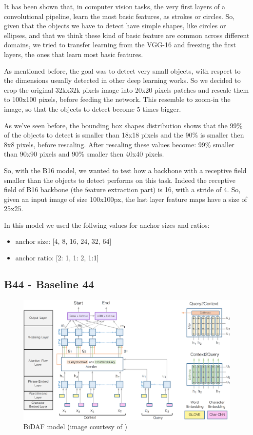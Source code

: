 \documentclass[a4paper,10pt]{report}
\begin{document}
It has been shown that, in computer vision tasks, the very first layers of a convolutional pipeline, learn the most basic features, as strokes or circles.
So, given that the objects we have to detect have simple shapes, like circles or ellipses, and that we think these kind of basic feature are common across different domains, 
we tried to transfer learning from the VGG-16 and freezing the first layers, the ones that learn most basic features.

As mentioned before, the goal was to detect very small objects, with respect to the dimensions usually detected in other deep learning works.
So we decided to crop the original 32kx32k pixels image into 20x20 pixels patches and rescale them to 100x100 pixels, before feeding the network.
This resemble to zoom-in the image, so that the objects to detect become 5 times bigger.

As we've seen before, the bounding box shapes distribution shows that the 99\% of the objects to detect is smaller than 18x18 pixels and the 90\% is smaller then 8x8 pixels, before rescaling.
After rescaling these values become: 99\% smaller than 90x90 pixels and 90\% smaller then 40x40 pixels.

So, with the B16 model, we wanted to test how a backbone with a receptive field smaller than the objects to detect performs on this task.
Indeed the receptive field of B16 backbone (the feature extraction part) is 16, with a stride of 4. So, given an input image of size 100x100px, the last layer feature maps have a size of 25x25.

In this model we used the follwing values for anchor sizes and ratios:
\begin{itemize}
  \item anchor size: [4, 8, 16, 24, 32, 64]
  \item anchor ratio: [2: 1, 1: 2, 1:1]
\end{itemize}

\subsection{B44 - Baseline 44}\label{subsec:b44}


\begin{figure}[h]
  \center
  \includegraphics[width=0.85\linewidth]{bidaf}
  \caption{BiDAF model (image courtesy of \cite{bidaf})}
  \label{fig:bidaf}
\end{figure}
\end{document}
